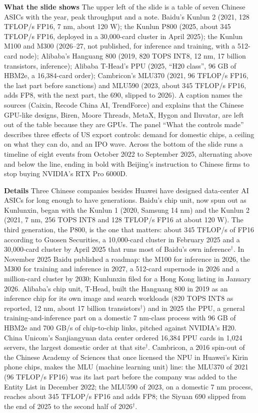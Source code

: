 \documentclass[11pt,letterpaper]{article}
\newcommand{\para}[1]{\medskip\noindent\textbf{#1}\quad}
\begin{document}
\para{What the slide shows} The upper left of the slide is a table of seven Chinese ASICs with the year, peak throughput and a note. Baidu's Kunlun 2 (2021, 128 TFLOP/s FP16, 7 nm, about 120 W); the Kunlun P800 (2025, about 345 TFLOP/s FP16, deployed in a 30{,}000-card cluster in April 2025); the Kunlun M100 and M300 (2026--27, not published, for inference and training, with a 512-card node); Alibaba's Hanguang 800 (2019, 820 TOPS INT8, 12 nm, 17 billion transistors, inference); Alibaba T-Head's PPU (2025, ``H20 class'', 96 GB of HBM2e, a 16{,}384-card order); Cambricon's MLU370 (2021, 96 TFLOP/s FP16, the last part before sanctions) and MLU590 (2023, about 345 TFLOP/s FP16, adds FP8, with the next part, the 690, slipped to 2026). A caption names the sources (Caixin, Recode China AI, TrendForce) and explains that the Chinese GPU-like designs, Biren, Moore Threads, MetaX, Hygon and Iluvatar, are left out of the table because they are GPUs. The panel ``What the controls made'' describes three effects of US export controls: demand for domestic chips, a ceiling on what they can do, and an IPO wave. Across the bottom of the slide runs a timeline of eight events from October 2022 to September 2025, alternating above and below the line, ending in bold with Beijing's instruction to Chinese firms to stop buying NVIDIA's RTX Pro 6000D.

\para{Details} Three Chinese companies besides Huawei have designed data-center AI ASICs for long enough to have generations. Baidu's chip unit, now spun out as Kunlunxin, began with the Kunlun 1 (2020, Samsung 14 nm) and the Kunlun 2 (2021, 7 nm, 256 TOPS INT8 and 128 TFLOP/s FP16 at about 120 W). The third generation, the P800, is the one that matters: about 345 TFLOP/s of FP16 according to Guosen Securities, a 10{,}000-card cluster in February 2025 and a 30{,}000-card cluster by April 2025 that runs most of Baidu's own inference$^\dagger$. In November 2025 Baidu published a roadmap: the M100 for inference in 2026, the M300 for training and inference in 2027, a 512-card supernode in 2026 and a million-card cluster by 2030; Kunlunxin filed for a Hong Kong listing in January 2026. Alibaba's chip unit, T-Head, built the Hanguang 800 in 2019 as an inference chip for its own image and search workloads (820 TOPS INT8 as reported, 12 nm, about 17 billion transistors$^\dagger$) and in 2025 the PPU, a general training-and-inference part on a domestic 7 nm-class process with 96 GB of HBM2e and 700 GB/s of chip-to-chip links, pitched against NVIDIA's H20. China Unicom's Sanjiangyuan data center ordered 16{,}384 PPU cards in 1{,}024 servers, the largest domestic order at that site$^\dagger$. Cambricon, a 2016 spin-out of the Chinese Academy of Sciences that once licensed the NPU in Huawei's Kirin phone chips, makes the MLU (machine learning unit) line: the MLU370 of 2021 (96 TFLOP/s FP16) was its last part before the company was added to the Entity List in December 2022; the MLU590 of 2023, on a domestic 7 nm process, reaches about 345 TFLOP/s FP16 and adds FP8; the Siyuan 690 slipped from the end of 2025 to the second half of 2026$^\dagger$.
\end{document}
